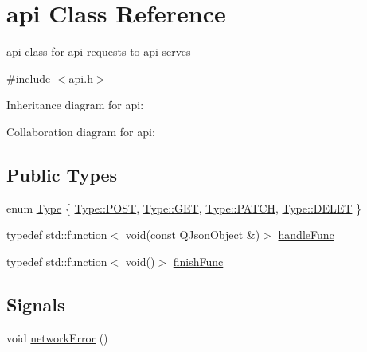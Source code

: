 \hypertarget{classapi}{}\section{api Class Reference}
\label{classapi}


api class for api requests to api serves  




{\ttfamily \#include $<$api.\+h$>$}



Inheritance diagram for api\+:


Collaboration diagram for api\+:
\subsection*{Public Types}
\begin{DoxyCompactItemize}
\item 
enum \hyperlink{classapi_a4d626d9c11b80e532928299e68ff5bd9}{Type} \{ \hyperlink{classapi_a4d626d9c11b80e532928299e68ff5bd9aa02439ec229d8be0e74b0c1602392310}{Type\+::\+P\+O\+ST}, 
\hyperlink{classapi_a4d626d9c11b80e532928299e68ff5bd9a7528035a93ee69cedb1dbddb2f0bfcc8}{Type\+::\+G\+ET}, 
\hyperlink{classapi_a4d626d9c11b80e532928299e68ff5bd9a63bc9a3997d66d835d9f3ec29451407d}{Type\+::\+P\+A\+T\+CH}, 
\hyperlink{classapi_a4d626d9c11b80e532928299e68ff5bd9aa66ccb41361ea301c34b3ea85c7ae7a6}{Type\+::\+D\+E\+L\+ET}
 \}
\item 
typedef std\+::function$<$ void(const Q\+Json\+Object \&)$>$ \hyperlink{classapi_ae177be144c99e5b642bc435ff14f91eb}{handle\+Func}
\item 
typedef std\+::function$<$ void()$>$ \hyperlink{classapi_ac68be0fe2ba36f25c4f776b1eeff0482}{finish\+Func}
\end{DoxyCompactItemize}
\subsection*{Signals}
\begin{DoxyCompactItemize}
\item 
void \hyperlink{classapi_a859bdfdc9c9a77412443862ef24a438a}{network\+Error} ()
\end{DoxyCompactItemize}
